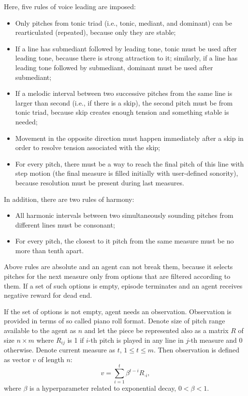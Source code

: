 \documentclass{article}
\begin{document}
Here, five rules of voice leading are imposed:
\begin{itemize}
	\item Only pitches from tonic triad (i.e., tonic, mediant, and dominant) can be rearticulated (repeated), because only they are stable;
	\item If a line has submediant followed by leading tone, tonic must be used after leading tone, because there is strong attraction to it; similarly, if a line has leading tone followed by submediant, dominant must be used after submediant;
	\item If a melodic interval between two successive pitches from the same line is larger than second (i.e., if there is a skip), the second pitch must be from tonic triad, because skip creates enough tension and something stable is needed;
	\item Movement in the opposite direction must happen immediately after a skip in order to resolve tension associated with the skip;
	\item For every pitch, there must be a way to reach the final pitch of this line with step motion (the final measure is filled initially with user-defined sonority), because resolution must be present during last measures.
\end{itemize}
In addition, there are two rules of harmony:
\begin{itemize}
	\item All harmonic intervals between two simultaneously sounding pitches from different lines must be consonant;
	\item For every pitch, the closest to it pitch from the same measure must be no more than tenth apart.
\end{itemize}

Above rules are absolute and an agent can not break them, because it selects pitches for the next measure only from options that are filtered according to them. If a set of such options is empty, episode terminates and an agent receives negative reward for dead end.

If the set of options is not empty, agent needs an observation. Observation is provided in terms of so called piano roll format. Denote size of pitch range available to the agent as $n$ and let the piece be represented also as a matrix $R$ of size $n \times m$ where $R_{ij}$ is 1 if $i$-th pitch is played in any line in $j$-th measure and 0 otherwise. Denote current measure as $t$, $1 \le t \le m$. Then observation is defined as vector $v$ of length $n$:
$$v = \sum_{i = 1}^t \beta^{t - i} R_{\cdot i},$$
where $\beta$ is a hyperparameter related to exponential decay, $0 < \beta < 1$.
\end{document}

